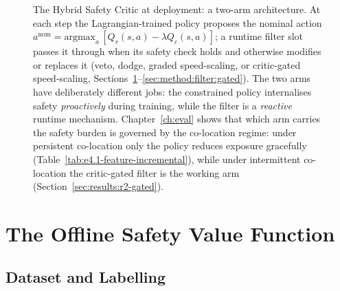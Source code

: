 \documentclass[11pt,a4paper]{report}
\begin{document}
\begin{figure}[htbp]
{%
}
\caption{The Hybrid Safety Critic at deployment: a two-arm
architecture. At each step the Lagrangian-trained policy proposes the
nominal action
$a^{\mathrm{nom}} = \mathrm{argmax}_a\,[Q_r(s,a) - \lambda Q_c(s,a)]$;
a runtime filter slot passes it through when its safety check holds
and otherwise modifies or replaces it (veto, dodge, graded
speed-scaling, or critic-gated speed-scaling,
Sections~\ref{sec:method:filter}--\ref{sec:method:filter:gated}). The
two arms have deliberately different jobs: the constrained policy
internalises safety \emph{proactively} during training, while the
filter is a \emph{reactive} runtime mechanism. Chapter~\ref{ch:eval}
shows that which arm carries the safety burden is governed by the
co-location regime: under persistent co-location only the policy
reduces exposure gracefully
(Table~\ref{tab:e4.1-feature-incremental}), while under intermittent
co-location the critic-gated filter is the working arm
(Section~\ref{sec:results:r2-gated}).}
\label{fig:hybrid-overview}
\end{figure}

\section{The Offline Safety Value Function}
\label{sec:method:filter}

\subsection{Dataset and Labelling}
\label{sec:method:filter:data}
\end{document}
